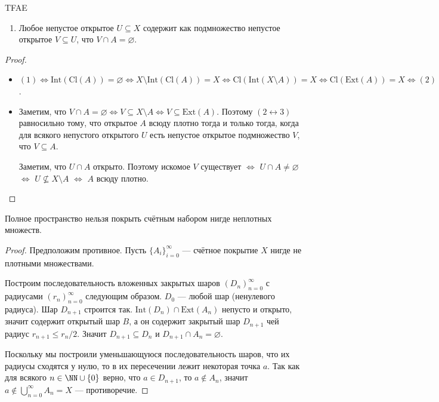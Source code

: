 \documentclass[12pt,a4paper]{article}
\newcommand{\Int}{\ensuremath{\mathrm{Int}}\xspace}
\newcommand{\Ext}{\ensuremath{\mathrm{Ext}}\xspace}
\newcommand{\Cl}{\ensuremath{\mathrm{Cl}}\xspace}
\begin{document}
    \begin{lemma}
        TFAE
        \begin{enumerate}
            \item Любое непустое открытое $U \subseteq X$ содержит как подмножество непустое открытое $V \subseteq U$, что $V \cap A = \varnothing$.
        \end{enumerate}
    \end{lemma}

    \begin{proof}
        \begin{itemize}
            \item $(1) \Leftrightarrow \Int(\Cl(A)) = \varnothing \Leftrightarrow X \setminus \Int(\Cl(A)) = X \Leftrightarrow \Cl(\Int(X \setminus A)) = X \Leftrightarrow \Cl(\Ext(A)) = X \Leftrightarrow (2)$.
            \item Заметим, что $V \cap A = \varnothing \Leftrightarrow V \subseteq X \setminus A \Leftrightarrow V \subseteq \Ext(A)$. Поэтому $(2 \leftrightarrow 3)$ равносильно тому, что открытое $A$ всюду плотно тогда и только тогда, когда для всякого непустого открытого $U$ есть непустое открытое подмножество $V$, что $V \subseteq A$.

            Заметим, что $U \cap A$ открыто. Поэтому искомое $V$ существует $\Leftrightarrow$ $U \cap A \neq \varnothing$ $\Leftrightarrow$ $U \nsubseteq X \setminus A$ $\Leftrightarrow$ $A$ всюду плотно.
        \end{itemize}
    \end{proof}

    \begin{theorem}[Бэра]
        Полное пространство нельзя покрыть счётным набором нигде неплотных множеств.
    \end{theorem}

    \begin{proof}
        Предположим противное. Пусть $\{A_i\}_{i=0}^\infty$ --- счётное покрытие $X$ нигде не плотными множествами.

        Построим последовательность вложенных закрытых шаров $(D_n)_{n=0}^\infty$ с радиусами $(r_n)_{n=0}^\infty$ следующим образом. $D_0$ --- любой шар (ненулевого радиуса). Шар $D_{n+1}$ строится так. $\Int(D_n) \cap \Ext(A_n)$ непусто и открыто, значит содержит открытый шар $B$, а он содержит закрытый шар $D_{n+1}$ чей радиус $r_{n+1} \leqslant r_n/2$. Значит $D_{n+1} \subseteq D_n$ и $D_{n+1} \cap A_n = \varnothing$.
        
        Поскольку мы построили уменьшающуюся последовательность шаров, что их радиусы сходятся у нулю, то в их пересечении лежит некоторая точка $a$. Так как для всякого $n \in \NN \cup \{0\}$ верно, что $a \in D_{n+1}$, то $a \notin A_n$, значит $a \notin \bigcup_{n=0}^\infty A_n = X$ --- противоречие.
    \end{proof}
\end{document}
